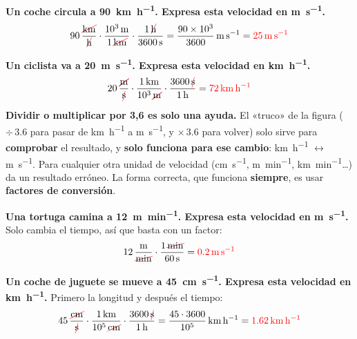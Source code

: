 \begin{example}
    \textbf{Un coche circula a \qty{90}{\km\per\hour}. Expresa esta velocidad en \unit{\m\per\s}.}
    \begin{equation*}
        \num{90}\,\dfrac{\cancelunit{\km}}{\cancelunit{\hour}} \cdot \dfrac{\qty{e3}{\m}}{1\,\cancelunit{\km}} \cdot \dfrac{1\,\cancelunit{\hour}}{\qty{3600}{\s}} = \dfrac{\num{90e3}}{3600}\,\unit{\m\per\s} = \textcolor{red}{\qty{25}{\m\per\s}}
    \end{equation*}
\end{example}

\begin{example}
    \textbf{Un ciclista va a \qty{20}{\m\per\s}. Expresa esta velocidad en \unit{\km\per\hour}.}
    \begin{equation*}
        \num{20}\,\dfrac{\cancelunit{\m}}{\cancelunit{\s}} \cdot \dfrac{\qty{1}{\km}}{\num{e3}\,\cancelunit{\m}} \cdot \dfrac{\num{3600}\,\cancelunit{\s}}{\qty{1}{\hour}} = \textcolor{red}{\qty{72}{\km\per\hour}}
    \end{equation*}
\end{example}

\begin{marker}
    \textbf{Dividir o multiplicar por 3,6 es solo una ayuda.} El «truco» de la figura (\(\div\,3.6\) para pasar de \unit{\km\per\hour} a \unit{\m\per\s}, y \(\times\,3.6\) para volver) solo sirve para \textbf{comprobar} el resultado, y \textbf{solo funciona para ese cambio}: \unit{\km\per\hour} \(\leftrightarrow\) \unit{\m\per\s}. Para cualquier otra unidad de velocidad (\unit{\cm\per\s}, \unit{\m\per\minute}, \unit{\km\per\minute}\ldots) da un resultado erróneo. La forma correcta, que funciona \textbf{siempre}, es usar \textbf{factores de conversión}.
\end{marker}

\begin{example}
    \textbf{Una tortuga camina a \qty{12}{\m\per\minute}. Expresa esta velocidad en \unit{\m\per\s}.} Solo cambia el tiempo, así que basta con un factor:
    \begin{equation*}
        \num{12}\,\dfrac{\unit{\m}}{\cancelunit{\minute}} \cdot \dfrac{1\,\cancelunit{\minute}}{\qty{60}{\s}} = \textcolor{red}{\qty{0.2}{\m\per\s}}
    \end{equation*}
\end{example}

\begin{example}
    \textbf{Un coche de juguete se mueve a \qty{45}{\cm\per\s}. Expresa esta velocidad en \unit{\km\per\hour}.} Primero la longitud y después el tiempo:
    \begin{equation*}
        \num{45}\,\dfrac{\cancelunit{\cm}}{\cancelunit{\s}} \cdot \dfrac{\qty{1}{\km}}{\num{e5}\,\cancelunit{\cm}} \cdot \dfrac{\num{3600}\,\cancelunit{\s}}{\qty{1}{\hour}} = \dfrac{\num{45} \cdot \num{3600}}{\num{e5}}\,\unit{\km\per\hour} = \textcolor{red}{\qty{1.62}{\km\per\hour}}
    \end{equation*}
\end{example}

